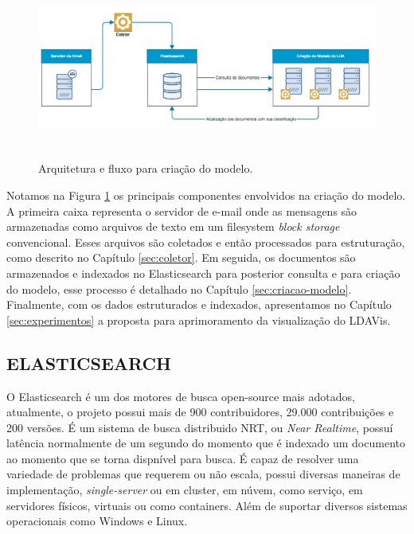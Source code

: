 \documentclass[12pt,a4paper]{article}
\begin{document}
 \begin{figure}[H]
	\centering
    \includegraphics[height=6cm]{images/figure_11.jpg}
    \caption{Arquitetura e fluxo para criação do modelo.}
    \label{fig-framework-lda}
\end{figure}

Notamos na Figura \ref{fig-framework-lda} os principais componentes envolvidos na criação do modelo. A primeira caixa representa o servidor de 
 e-mail onde as mensagens são armazenadas como arquivos de texto em um filesystem \textit{block storage} convencional. Esses arquivos são coletados e então
 processados para estruturação, como descrito no Capítulo \ref{sec:coletor}. Em seguida, os documentos são armazenados e indexados no Elasticsearch para
 posterior consulta e para criação do modelo, esse processo é detalhado no Capítulo \ref{sec:criacao-modelo}. Finalmente, com os dados estruturados
 e indexados, apresentamos no Capítulo \ref{sec:experimentos} a proposta para aprimoramento da visualização do LDAVis.

\subsection{ELASTICSEARCH} \label{sec:elasticsearch}

O Elasticsearch é um dos motores de busca open-source mais adotados, atualmente, o projeto possui mais de 900 contribuidores, 29.000
 contribuições e 200 versões. É um sistema de busca distribuido NRT, ou \textit{Near Realtime}, possuí latência normalmente de um segundo
 do momento que é indexado um documento ao momento que se torna dispnível para busca. É capaz de resolver uma variedade de problemas que requerem ou não escala,
 possui diversas maneiras de implementação, \textit{single-server} ou em cluster, em núvem, como serviço, em servidores físicos, virtuais ou como containers.
 Além de suportar diversos sistemas operacionais como Windows e Linux.
\end{document}
